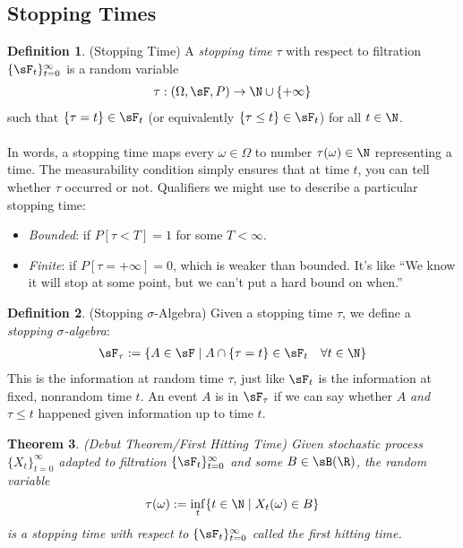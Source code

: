 \documentclass[12pt]{article}
\theoremstyle{plain}
\newtheorem{thm}{Theorem}[section]
\theoremstyle{definition}
\newtheorem{defn}[thm]{Definition}
\theoremstyle{remark}
\newcommand{\ra}{\rightarrow}
\newcommand{\tinfz}{_{t=0}^\infty}
\begin{document}
\clearpage
\subsection{Stopping Times}

\begin{defn}(Stopping Time)
A \emph{stopping time} $\tau$ with respect to filtration
$\{\sF_t\}\tinfz$ is a random variable
\begin{align*}
  \tau: (\Omega,\sF,P)\ra \N \cup \{+\infty\}
\end{align*}
such that $\{\tau=t\}\in \sF_t$ (or equivalently $\{\tau\leq
t\}\in\sF_t$) for all $t\in\N$.
\\
\\
In words, a stopping time maps every $\omega\in\Omega$ to number
$\tau(\omega)\in\N$ representing a time. The measurability condition
simply ensures that at time $t$, you can tell whether $\tau$ occurred or
not.
Qualifiers we might use to describe a particular stopping time:
\begin{itemize}
  \item \emph{Bounded}: if $P[\tau < T]=1$ for some $T<\infty$.
  \item \emph{Finite}: if $P[\tau=+\infty]=0$, which is weaker than
    bounded. It's like ``We know it will stop at some point, but we
    can't put a hard bound on when.''
\end{itemize}
\end{defn}

\begin{defn}(Stopping $\sigma$-Algebra)
Given a stopping time $\tau$, we define a
\emph{stopping $\sigma$-algebra}:
\begin{align*}
  \sF_\tau :=
  \{A\in\sF \;|\; A\cap \{\tau=t\} \in \sF_t \quad \forall t\in\N\}
\end{align*}
This is the information at random time $\tau$, just like $\sF_t$ is the
information at fixed, nonrandom time $t$. An event $A$ is in $\sF_\tau$
if we can say whether $A$ \emph{and} $\tau\leq t$ happened given
information up to time $t$.
\end{defn}

\begin{thm}\emph{(Debut Theorem/First Hitting Time)}
Given stochastic process $\{X_t\}\tinfz$ adapted to filtration
$\{\sF_t\}\tinfz$ and some $B\in\sB(\R)$, the random variable
\begin{align*}
  \tau(\omega) := \inf_t\{t\in\N \;|\; X_t(\omega) \in B\}
\end{align*}
is a stopping time with respect to $\{\sF_t\}\tinfz$ called the
\emph{first hitting time}.
\end{thm}
\end{document}

